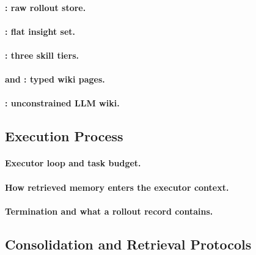 \paragraph{: raw rollout store.}

\paragraph{: flat insight set.}

\paragraph{: three skill tiers.}

\paragraph{ and : typed wiki pages.}

\paragraph{: unconstrained LLM wiki.}

\subsection{Execution Process}

\paragraph{Executor loop and task budget.}

\paragraph{How retrieved memory enters the executor context.}

\paragraph{Termination and what a rollout record contains.}

\subsection{Consolidation and Retrieval Protocols}

